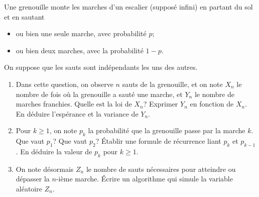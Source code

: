 \documentclass[../PolyS4.tex]{subfiles}
\begin{document}
Une grenouille monte les marches d'un escalier (supposé infini) en partant du sol et en sautant 
\begin{itemize}
\item ou bien une seule marche, avec probabilité $p$;
\item ou bien deux marches, avec la probabilité $1-p$.
\end{itemize}
On suppose que les sauts sont indépendants les uns des autres. 
\begin{enumerate}
\item Dans cette question, on observe $n$ sauts de la grenouille, et on note $X_n$ le nombre de fois où la grenouille a sauté une marche, et $Y_n$ le nombre de marches franchies. Quelle est la loi de $X_n$? Exprimer $Y_n$ en fonction de $X_n$. En déduire l'espérance et la variance de $Y_n$.
\item Pour $k\geq 1$, on note $p_k$ la probabilité que la grenouille passe par la marche $k$. Que vaut $p_1$? Que vaut $p_2$? \'Etablir une formule de récurrence liant $p_k$ et $p_{k-1}$. En déduire la valeur de $p_k$ pour $k\geq 1$.
\item On note désormais $Z_n$ le nombre de sauts nécessaires pour atteindre ou dépasser la $n$-ième marche. \'Ecrire un algorithme qui simule la variable aléatoire $Z_n$.\\

\end{enumerate}

\end{document}
